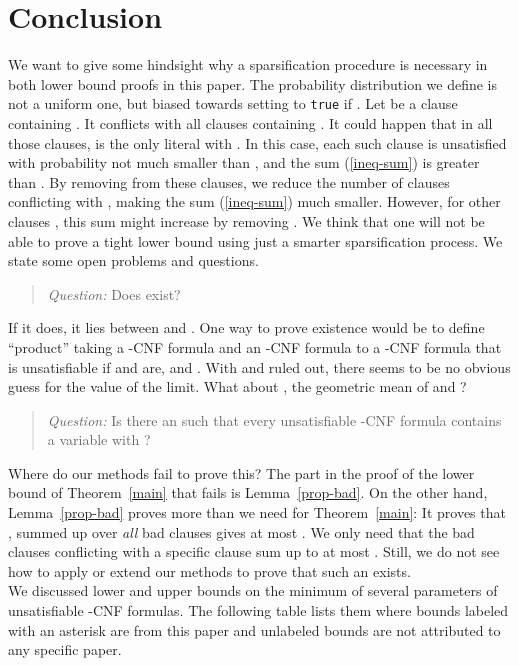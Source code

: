 \documentclass[a4paper, 11pt]{article}
\begin{document}
\section{Conclusion}

We want to give some hindsight why a sparsification procedure is
necessary in both lower bound proofs in this paper.  The probability
distribution we define is not a uniform one, but biased towards
setting  to \texttt{true} if .  Let
 be a clause containing . It conflicts with all clauses
containing . It could happen that in all those clauses, 
is the only literal with . In this case, each such
clause is unsatisfied with probability not much smaller than ,
and the sum (\ref{ineq-sum}) is greater than . By
removing  from these clauses, we reduce the number of clauses
conflicting with , making the sum (\ref{ineq-sum}) much smaller.
However, for other clauses , this sum might increase by removing
. We think that one will not be able to prove a tight lower bound
using just a smarter sparsification process. We state some open
problems and questions.

\begin{quotation}
{\em Question:} Does  exist?
\end{quotation}

If it does, it lies between  and . One way to prove
existence would be to define ``product'' taking a -CNF formula 
and an -CNF formula  to a -CNF formula 
that is unsatisfiable if  and  are, and . With  and  ruled out, there seems to be no obvious
guess for the value of the limit. What about ,
the geometric mean of  and ? 

\begin{quotation}
  {\em Question:} Is there an  such that every unsatisfiable
  -CNF formula contains a variable  with ?
\end{quotation}

Where do our methods fail to prove this? The part in the proof of the
lower bound of Theorem~\ref{main} that fails is Lemma~\ref{prop-bad}.
On the other hand, Lemma~\ref{prop-bad} proves more than we need for
Theorem~\ref{main}: It proves that , summed up
over {\em all} bad clauses gives at most . We only need
that the bad clauses conflicting with a specific clause sum up to at
most . Still, we do not see how to apply or extend our
methods to prove that such an  exists.\\

We discussed lower and upper bounds on the minimum of several parameters
of unsatisfiable -CNF formulas. The following table lists them
where bounds labeled with an asterisk are from this paper and
unlabeled bounds are not attributed to any specific paper. 
\end{document}
